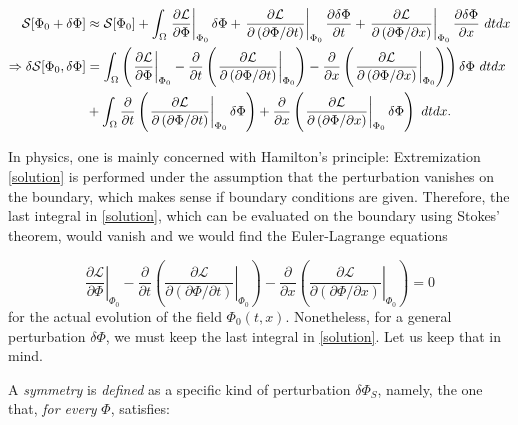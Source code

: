\documentclass{article}
\begin{document}
\begin{align}\label{solution}
\mathcal{S}[\Phi_0+\delta\Phi]&\approx\mathcal{S}[\Phi_0]+\int_\Omega\left.\frac{\partial \mathcal{L}}{\partial\Phi}\right|_{\Phi_0}\delta\Phi+\left.\frac{\partial \mathcal{L}}{\partial\left(\partial\Phi/\partial t\right)}\right|_{\Phi_0}\frac{\partial\delta\Phi}{\partial t}+\left.\frac{\partial \mathcal{L}}{\partial\left(\partial\Phi/\partial x\right)}\right|_{\Phi_0}\frac{\partial\delta\Phi}{\partial x}\text{ }dtdx\notag\\
\Rightarrow\delta\mathcal{S}[\Phi_0,\delta\Phi]&=\int_\Omega\left(\left.\frac{\partial \mathcal{L}}{\partial\Phi}\right|_{\Phi_0}-\frac{\partial}{\partial t}\left(\left.\frac{\partial \mathcal{L}}{\partial\left(\partial\Phi/\partial t\right)}\right|_{\Phi_0}\right)-\frac{\partial}{\partial x}\left(\left.\frac{\partial \mathcal{L}}{\partial\left(\partial\Phi/\partial x\right)}\right|_{\Phi_0}\right)\right)\delta\Phi\text{ }dtdx\notag\\
&+\int_{\Omega}\frac{\partial}{\partial t}\left(\left.\frac{\partial \mathcal{L}}{\partial\left(\partial\Phi/\partial t\right)}\right|_{\Phi_0}\delta\Phi\right)+\frac{\partial}{\partial x}\left(\left.\frac{\partial \mathcal{L}}{\partial\left(\partial\Phi/\partial x\right)}\right|_{\Phi_0}\delta\Phi\right)\text{ }dtdx.
\end{align}

In physics, one is mainly concerned with Hamilton's principle: Extremization \eqref{solution} is performed under the assumption that the perturbation vanishes on the boundary, which makes sense if boundary conditions are given. Therefore, the last integral in \eqref{solution}, which can be evaluated on the boundary using Stokes' theorem, would vanish and we would find the Euler-Lagrange equations

\begin{equation}\label{ELE}
\left.\frac{\partial \mathcal{L}}{\partial\Phi}\right|_{\Phi_0}-\frac{\partial}{\partial t}\left(\left.\frac{\partial \mathcal{L}}{\partial\left(\partial\Phi/\partial t\right)}\right|_{\Phi_0}\right)-\frac{\partial}{\partial x}\left(\left.\frac{\partial \mathcal{L}}{\partial\left(\partial\Phi/\partial x\right)}\right|_{\Phi_0}\right)=0
\end{equation}
for the actual evolution of the field $\Phi_0(t,x)$. Nonetheless, for a general perturbation $\delta\Phi$, we must keep the last integral in \eqref{solution}. Let us keep that in mind.

A \textit{symmetry} is \textit{defined} as a specific kind of perturbation $\delta\Phi_S$, namely, the one that, \textit{for every} $\Phi$, satisfies:
\end{document}

